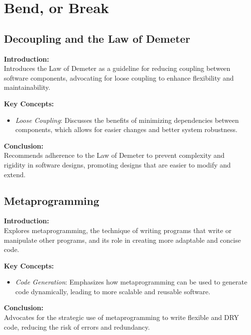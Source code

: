 
\section{Bend, or Break}

\subsection{Decoupling and the Law of Demeter}

\textbf{Introduction:} \\
Introduces the Law of Demeter as a guideline for reducing coupling between software components, advocating for loose coupling to enhance flexibility and maintainability.

\vspace{2mm}
\noindent\textbf{Key Concepts:}
\begin{itemize}
  \item \textit{Loose Coupling}: Discusses the benefits of minimizing dependencies between components, which allows for easier changes and better system robustness.
\end{itemize}

\vspace{2mm}
\noindent\textbf{Conclusion:} \\
Recommends adherence to the Law of Demeter to prevent complexity and rigidity in software designs, promoting designs that are easier to modify and extend.

\subsection{Metaprogramming}

\textbf{Introduction:} \\
Explores metaprogramming, the technique of writing programs that write or manipulate other programs, and its role in creating more adaptable and concise code.

\vspace{2mm}
\noindent\textbf{Key Concepts:}
\begin{itemize}
  \item \textit{Code Generation}: Emphasizes how metaprogramming can be used to generate code dynamically, leading to more scalable and reusable software.
\end{itemize}

\vspace{2mm}
\noindent\textbf{Conclusion:} \\
Advocates for the strategic use of metaprogramming to write flexible and DRY code, reducing the risk of errors and redundancy.

